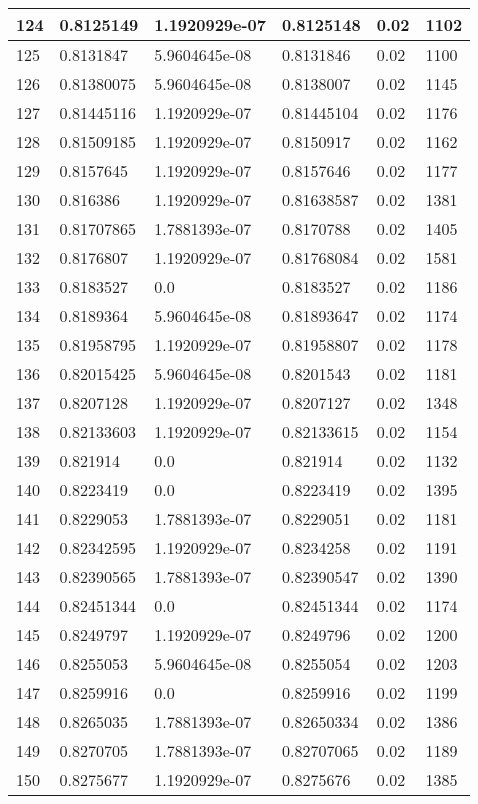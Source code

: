 \begin{longtable}{|l|l|l|l|l|l|}
124 & 0.8125149 & 1.1920929e-07 & 0.8125148 & 0.02 & 1102 \\ \hline 
125 & 0.8131847 & 5.9604645e-08 & 0.8131846 & 0.02 & 1100 \\ \hline 
126 & 0.81380075 & 5.9604645e-08 & 0.8138007 & 0.02 & 1145 \\ \hline 
127 & 0.81445116 & 1.1920929e-07 & 0.81445104 & 0.02 & 1176 \\ \hline 
128 & 0.81509185 & 1.1920929e-07 & 0.8150917 & 0.02 & 1162 \\ \hline 
129 & 0.8157645 & 1.1920929e-07 & 0.8157646 & 0.02 & 1177 \\ \hline 
130 & 0.816386 & 1.1920929e-07 & 0.81638587 & 0.02 & 1381 \\ \hline 
131 & 0.81707865 & 1.7881393e-07 & 0.8170788 & 0.02 & 1405 \\ \hline 
132 & 0.8176807 & 1.1920929e-07 & 0.81768084 & 0.02 & 1581 \\ \hline 
133 & 0.8183527 & 0.0 & 0.8183527 & 0.02 & 1186 \\ \hline 
134 & 0.8189364 & 5.9604645e-08 & 0.81893647 & 0.02 & 1174 \\ \hline 
135 & 0.81958795 & 1.1920929e-07 & 0.81958807 & 0.02 & 1178 \\ \hline 
136 & 0.82015425 & 5.9604645e-08 & 0.8201543 & 0.02 & 1181 \\ \hline 
137 & 0.8207128 & 1.1920929e-07 & 0.8207127 & 0.02 & 1348 \\ \hline 
138 & 0.82133603 & 1.1920929e-07 & 0.82133615 & 0.02 & 1154 \\ \hline 
139 & 0.821914 & 0.0 & 0.821914 & 0.02 & 1132 \\ \hline 
140 & 0.8223419 & 0.0 & 0.8223419 & 0.02 & 1395 \\ \hline 
141 & 0.8229053 & 1.7881393e-07 & 0.8229051 & 0.02 & 1181 \\ \hline 
142 & 0.82342595 & 1.1920929e-07 & 0.8234258 & 0.02 & 1191 \\ \hline 
143 & 0.82390565 & 1.7881393e-07 & 0.82390547 & 0.02 & 1390 \\ \hline 
144 & 0.82451344 & 0.0 & 0.82451344 & 0.02 & 1174 \\ \hline 
145 & 0.8249797 & 1.1920929e-07 & 0.8249796 & 0.02 & 1200 \\ \hline 
146 & 0.8255053 & 5.9604645e-08 & 0.8255054 & 0.02 & 1203 \\ \hline 
147 & 0.8259916 & 0.0 & 0.8259916 & 0.02 & 1199 \\ \hline 
148 & 0.8265035 & 1.7881393e-07 & 0.82650334 & 0.02 & 1386 \\ \hline 
149 & 0.8270705 & 1.7881393e-07 & 0.82707065 & 0.02 & 1189 \\ \hline 
150 & 0.8275677 & 1.1920929e-07 & 0.8275676 & 0.02 & 1385 \\ \hline 
\end{longtable}